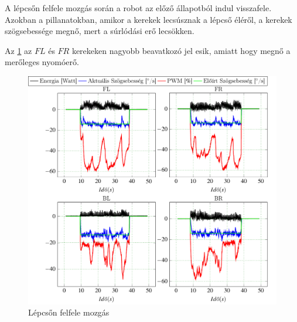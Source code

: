 A lépcsőn felfele mozgás során a robot az előző állapotból indul visszafele. Azokban a pillanatokban, amikor a kerekek lecsúsznak a lépcső éléről, a kerekek szögsebessége megnő, mert a súrlódási erő lecsökken.  

Az \ref{fig:LepcsoFelxx} az $FL$ és $FR$ kerekeken nagyobb beavatkozó jel esik, amiatt hogy megnő a merőleges nyomóerő.

\begin{figure}[H]
  \includegraphics{tikz/LepcsoFelxx.pdf}
  \caption{Lépcsőn felfele mozgás}
  \label{fig:LepcsoFelxx}
\end{figure}















